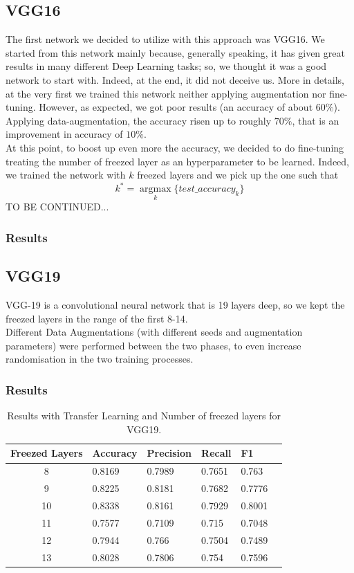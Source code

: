 \documentclass[10pt]{article}
\begin{document}
\subsection{VGG16}
The first network we decided to utilize with this approach was VGG16. We started from this network mainly because, generally speaking, it has given great results in many different Deep Learning tasks; so, we thought it was a good network to start with. Indeed, at the end, it did not deceive us. More in details, at the very first we trained this network neither applying augmentation nor fine-tuning. However, as expected, we got poor results (an accuracy of about $60\%$). Applying data-augmentation, the accuracy risen up to roughly $70\%$, that is an improvement in accuracy of $10\%$.\\
At this point, to boost up even more the accuracy, we decided to do fine-tuning treating the number of freezed layer as an hyperparameter to be learned. Indeed, we trained the network with $k$ freezed layers and we pick up the one such that
\begin{equation*}
    k^* = \underset{k}{\operatorname{argmax}}\{test\_accuracy_{k}\}
\end{equation*}
TO BE CONTINUED...
\subsubsection{Results}
\subsection{VGG19}
VGG-19 is a convolutional neural network that is 19 layers deep, so we kept the freezed layers in the range of the first 8-14.\\
Different Data Augmentations (with different seeds and augmentation parameters) were performed between the two phases,
to even increase randomisation in the two training processes.
\subsubsection{Results}
\begin{table}[ht]
\centering
\begin{adjustbox}{width=240}
\small
\begin{tabular}{|c|l|l|l|l|l}

\hline \bf Freezed Layers & \bf Accuracy & \bf Precision & \bf Recall & \bf F1 \\ \hline
8 & 0.8169 & 0.7989 & 0.7651 & 0.763\\
9 & 0.8225 & 0.8181 & 0.7682 & 0.7776\\
10 & 0.8338 & 0.8161 & 0.7929 & 0.8001\\
11 & 0.7577 & 0.7109 & 0.715 & 0.7048\\
12 & 0.7944 & 0.766 & 0.7504 & 0.7489\\
13 & 0.8028 & 0.7806 & 0.754 & 0.7596\\
\hline
\end{tabular}
\end{adjustbox}
\caption{Results with Transfer Learning and Number of freezed layers for VGG19.}
\end{table}
\end{document}
